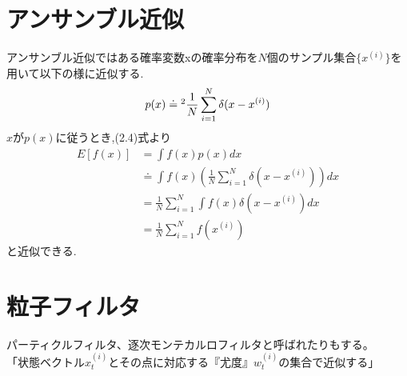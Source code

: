 \documentclass[dvipdfmx,uplatex,10pt]{jsarticle}
\begin{document}
\section{アンサンブル近似}
アンサンブル近似ではある確率変数xの確率分布を$N$個のサンプル集合$\{x^{(i)}\}$を用いて以下の様に近似する.
\begin{equation}
  p(x) \doteq \footnotemark[2] \frac{1}{N}\sum_{i=1}^{N}\delta(x-x^{(i)})
\end{equation}
$x$が$p(x)$に従うとき,(2.4)式より
\begin{align}
  E[f(x)]
  &=\int f(x)p(x)dx\nonumber\\
  &\doteq \int f(x)\left(\frac{1}{N}\sum_{i=1}^{N}\delta(x-x^{(i)})\right)dx \nonumber\\ 
  &=\frac{1}{N}\sum_{i=1}^{N}\int f(x)\delta(x-x^{(i)})dx\nonumber \\
  &=\frac{1}{N}\sum_{i=1}^{N}f(x^{(i)})
\end{align}
と近似できる.
\section{粒子フィルタ}
パーティクルフィルタ、逐次モンテカルロフィルタと呼ばれたりもする。\\
「状態ベクトル$x_{t}^{(i)}$とその点に対応する『尤度』$w_{t}^{(i)}$の集合で近似する」\\
\end{document}
